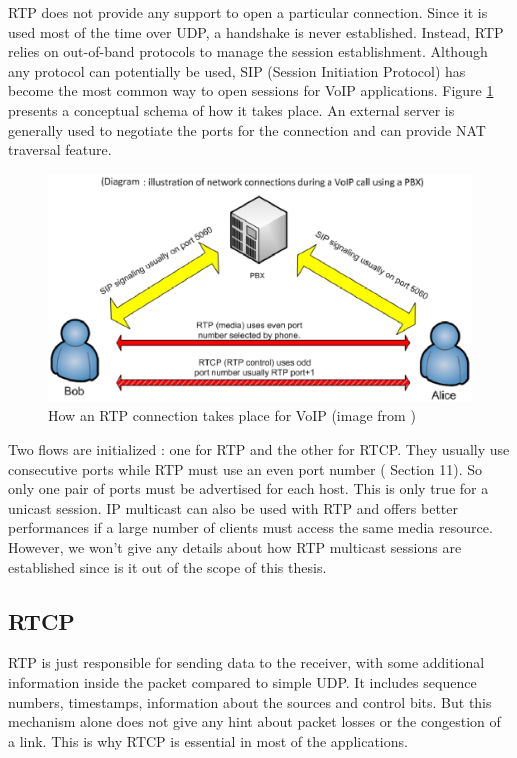 RTP does not provide any support to open a particular connection. Since it is used most of the time over UDP, a handshake is never established. Instead, RTP relies on out-of-band protocols to manage the session establishment. Although any protocol can potentially be used, SIP (Session Initiation Protocol) has become the most common way to open sessions for VoIP applications. Figure \ref{fig:rtp-sip} presents a conceptual schema of how it takes place. An external server is generally used to negotiate the ports for the connection and can provide NAT traversal feature.
\newpage
\begin{figure}[!ht]
\centering
\includegraphics[width=0.9\linewidth]{images/rtp_sip}
\caption[VoIP with RTP connection]{How an RTP connection takes place for VoIP (image from \cite{rtp-sip})}
\label{fig:rtp-sip}
\end{figure}


Two flows are initialized : one for RTP and the other for RTCP. They usually use consecutive ports while RTP must use an even port number (\cite{RFC3550} Section 11). So only one pair of ports must be advertised for each host. This is only true for a unicast session. IP multicast can also be used with RTP and offers better performances if a large number of clients must access the same media resource. However, we won't give any details about how RTP multicast sessions are established since is it out of the scope of this thesis.

\subsection{RTCP}\label{ssec:rtcp}

RTP is just responsible for sending data to the receiver, with some additional information inside the packet compared to simple UDP. It includes sequence numbers, timestamps, information about the sources and control bits. But this mechanism alone does not give any hint about packet losses or the congestion of a link. This is why RTCP is essential in most of the applications.

